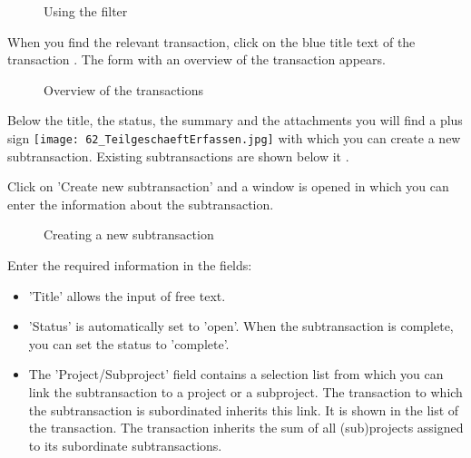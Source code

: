\begin{figure}[H]
\caption{Using the filter}
\end{figure}

When you find the relevant transaction, click on the blue title text of the transaction . The form with an overview of the transaction appears.

\begin{figure}[H]
\caption{Overview of the transactions}
\end{figure}

Below the title, the status, the summary and the attachments you will find a plus sign \texttt{[image: 62\_TeilgeschaeftErfassen.jpg]}  with which you can create a new subtransaction. Existing subtransactions are shown below it .

\vspace{\baselineskip}

Click on 'Create new subtransaction' and a window is opened in which you can enter the information about the subtransaction.

\begin{figure}[H]
\caption{Creating a new subtransaction}
\end{figure}

Enter the required information in the fields:

\begin{itemize}
\item
'Title'  allows the input of free text.
\item
'Status'  is automatically set to 'open'. When the subtransaction is complete, you can set the status to 'complete'.
\item
The 'Project/Subproject' field  contains a selection list from which you can link the subtransaction to a project or a subproject. The transaction to which the subtransaction is subordinated inherits this link. It is shown in the list of the transaction. The transaction inherits the sum of all (sub)projects assigned to its subordinate subtransactions.
\end{itemize}

